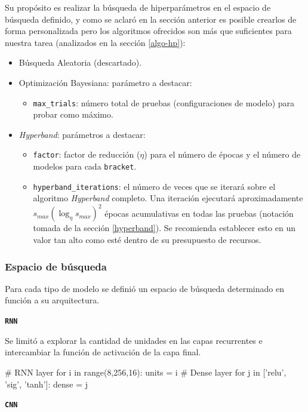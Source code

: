 \documentclass[a4paper,12pt]{article}
\begin{document}
Su propósito es realizar la búsqueda de hiperparámetros en el espacio de búsqueda definido, y como se aclaró en la sección anterior es posible crearlos de forma personalizada pero los algoritmos ofrecidos son más que suficientes para nuestra tarea (analizados en la sección \ref{algo-hp}):
\begin{itemize}[noitemsep, topsep=2pt]
	\item Búsqueda Aleatoria (descartado).
	\item Optimización Bayesiana: parámetro a destacar:
	\begin{itemize}[noitemsep, topsep=2pt]
		\item \texttt{max\_trials}: número total de pruebas (configuraciones de modelo) para probar como máximo.
	\end{itemize}
	\item \textit{Hyperband}: parámetros a destacar:
	\begin{itemize}[noitemsep, topsep=2pt]
		\item \texttt{factor}: factor de reducción ($\eta$) para el número de épocas y el número de modelos para cada \texttt{bracket}.
		\item \texttt{hyperband\_iterations}: el número de veces que se iterará sobre el algoritmo \textit{Hyperband} completo. Una iteración ejecutará aproximadamente $s_{max}(\log_{\eta} s_{max})^2$ épocas acumulativas en todas las pruebas (notación tomada de la sección \ref{hyperband}). Se recomienda establecer esto en un valor tan alto como esté dentro de su presupuesto de recursos.
	\end{itemize}
\end{itemize}

\subsubsection{Espacio de búsqueda}
Para cada tipo de modelo se definió un espacio de búsqueda determinado en función a su arquitectura.

\textbf{\texttt{RNN}}

Se limitó a explorar la cantidad de unidades en las capas recurrentes e intercambiar la función de activación de la capa final.

\begin{python}
# RNN layer
for i in range(8,256,16):
	units = i
# Dense layer
for j in ['relu', 'sig', 'tanh']:
		dense = j
\end{python}

\textbf{\texttt{CNN}}
\end{document}
